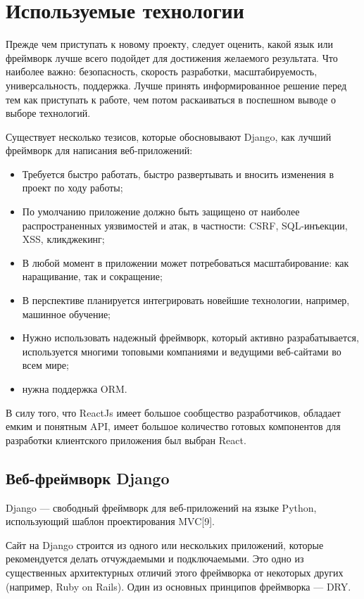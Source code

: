 \lstset{style=fsharpstyle}

\section{Используемые технологии}
Прежде чем приступать к новому проекту, следует оценить, какой язык или фреймворк лучше всего подойдет для достижения желаемого результата.
Что  наиболее важно: безопасность, скорость разработки, масштабируемость, универсальность, поддержка.
Лучше принять информированное решение перед тем как приступать к работе, чем потом раскаиваться в поспешном выводе о выборе технологий.

Существует несколько тезисов, которые обосновывают Django, как лучший фреймворк для написания веб-приложений:
\begin{itemize}
    \item Требуется быстро работать, быстро развертывать и вносить изменения в проект по ходу работы;
    \item По умолчанию приложение должно быть защищено от наиболее распространенных уязвимостей и атак, в частности: CSRF, SQL-инъекции, XSS, кликджекинг;
    \item В любой момент в приложении может потребоваться масштабирование: как наращивание, так и сокращение;
    \item В перспективе планируется интегрировать новейшие технологии, например, машинное обучение;
    \item Нужно использовать надежный фреймворк, который активно разрабатывается, используется многими топовыми компаниями и ведущими веб-сайтами во всем мире;
    \item нужна поддержка ORM.
\end{itemize}

В силу того, что ReactJs имеет большое сообщество разработчиков, обладает емким и понятным API, имеет большое количество готовых компонентов для разработки клиентского приложения был выбран React.

\subsection{Веб-фреймворк Django}
Django — свободный фреймворк для веб-приложений на языке Python, использующий шаблон проектирования MVC[9].

Сайт на Django строится из одного или нескольких приложений, которые рекомендуется делать отчуждаемыми и подключаемыми.
Это одно из существенных архитектурных отличий этого фреймворка от некоторых других (например, Ruby on Rails).
Один из основных принципов фреймворка — DRY.

